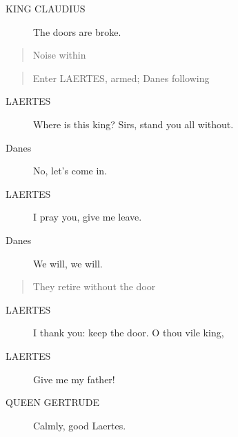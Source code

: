 \documentclass{article}
\begin{document}
\begin{description}
            
\item[KING CLAUDIUS] The doors are broke.
\end{description}
          
\begin{quote}
Noise within
\end{quote}
          
\begin{quote}
Enter LAERTES, armed; Danes following
\end{quote}
          
\begin{description}
            
\item[LAERTES] Where is this king? Sirs, stand you all without.
\end{description}
          
\begin{description}
            
\item[Danes] No, let's come in.
\end{description}
          
\begin{description}
            
\item[LAERTES] I pray you, give me leave.
\end{description}
          
\begin{description}
            
\item[Danes] We will, we will.
\end{description}
          
\begin{quote}
They retire without the door
\end{quote}
          
\begin{description}
            
\item[LAERTES] I thank you: keep the door. O thou vile king,
\item[LAERTES] Give me my father!
\end{description}
          
\begin{description}
            
\item[QUEEN GERTRUDE] Calmly, good Laertes.
\end{description}
          
\end{document}
